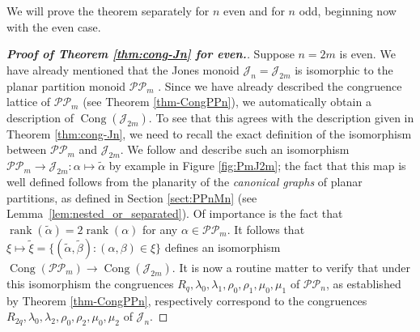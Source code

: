 \documentclass[11pt,a4paper]{article}
\newcommand{\PP}{\mathscr{P}\P}
\renewcommand{\P}{\mathcal P}
\newcommand{\J}{\mathcal J}
\newcommand{\al}{\alpha}
\newcommand{\be}{\beta}
\newcommand{\alt}{\widetilde{\al}}
\newcommand{\bet}{\widetilde{\be}}
\newcommand{\xit}{\widetilde{\xi}}
\newcommand{\Cong}{\operatorname{Cong}}
\newcommand{\rank}{\operatorname{rank}}
\newcommand{\bigset}[2]{\big\{ {#1}: {#2} \big\}}
\newcommand{\1}{\id_n}
\newcommand{\mt}{\mapsto}
\numberwithin{equation}{section}
\theoremstyle{definition}
\begin{document}
\begin{itemize}
\begin{itemize}
\begin{itemize}
\begin{itemize}
\begin{itemize}
\begin{itemize}
\begin{itemize}
We will prove the theorem separately for $n$ even and for $n$ odd, beginning now with the even case.  




\begin{proof}[{\bf Proof of Theorem \ref{thm:cong-Jn} for  even.}]
Suppose $n=2m$ is even.  We have already mentioned that the Jones monoid $\J_n=\J_{2m}$ is isomorphic to the planar partition monoid $\PP_m$ \cite{HR2005,Jones1994_2}.  
%
Since we have already described the congruence lattice of $\PP_m$ (see Theorem \ref{thm-CongPPn}), we automatically obtain a description of $\Cong(\J_{2m})$.  To see that this agrees with the description given in Theorem \ref{thm:cong-Jn}, we need to recall the exact definition of the isomorphism between $\PP_m$ and $\J_{2m}$.  
We follow \cite[p873]{HR2005} and describe such an isomorphism $\PP_m\to\J_{2m}:\al\mt\alt$ by example in Figure \ref{fig:PmJ2m}; the fact that this map is well defined follows from the planarity of the \emph{canonical graphs} of planar partitions, as defined in Section \ref{sect:PPnMn} (see Lemma~\ref{lem:nested_or_separated}).  Of importance is the fact that $\rank(\alt)=2\rank(\al)$ for any $\al\in\PP_m$.
%
 It follows that $\xi\mt\xit=\bigset{(\alt,\bet)}{(\al,\be)\in\xi}$ defines an isomorphism $\Cong(\PP_m)\to\Cong(\J_{2m})$.  
It is now a routine matter to verify that under this isomorphism the congruences $R_q,\lambda_0,\lambda_1,\rho_0,\rho_1,\mu_0,\mu_1$ of $\PP_n$, as established by Theorem \ref{thm-CongPPn}, respectively correspond to the congruences
$R_{2q},\lambda_0,\lambda_2,\rho_0,\rho_2,\mu_0,\mu_2$ of $\J_n$.
\end{proof}




\end{itemize}
\end{itemize}
\end{itemize}
\end{itemize}
\end{itemize}
\end{itemize}
\end{itemize}
\end{document}
